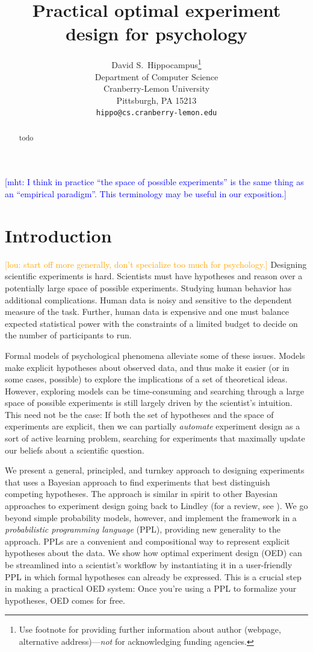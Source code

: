 \documentclass{article}
\title{Practical optimal experiment design for psychology}
\author{
  David S.~Hippocampus\thanks{Use footnote for providing further
    information about author (webpage, alternative
    address)---\emph{not} for acknowledging funding agencies.} \\
  Department of Computer Science\\
  Cranberry-Lemon University\\
  Pittsburgh, PA 15213 \\
  \texttt{hippo@cs.cranberry-lemon.edu} \\
}
\newcommand{\mht}[1]{\textcolor{Blue}{[mht: #1]}}
\newcommand{\lou}[1]{\textcolor{orange}{[lou: #1]}}
\begin{document}

\maketitle

\begin{abstract}
todo
\end{abstract}

\mht{I think in practice ``the space of possible experiments'' is the same thing as an ``empirical paradigm''. This terminology may be useful in our exposition.}

\section{Introduction}
\lou{start off more generally, don't specialize too much for psychology.}
Designing scientific experiments is hard.
Scientists must have hypotheses and reason over a potentially large space of possible experiments.
Studying human behavior has additional complications.
Human data is noisy and sensitive to the dependent measure of the task.
Further, human data is expensive and one must balance expected statistical power with the constraints of a limited budget to decide on the number of participants to run.

Formal models of psychological phenomena alleviate some of these issues.
Models make explicit hypotheses about observed data, and thus make it easier (or in some cases, possible) to explore the implications of a set of theoretical ideas.
However, exploring models can be time-consuming and searching through a large space of possible experiments is still largely driven by the scientist's intuition.
This need not be the case: If both the set of hypotheses and the space of experiments are explicit, then we can partially \emph{automate} experiment design as a sort of active learning problem, searching for experiments that maximally update our beliefs about a scientific question.

We present a general, principled, and turnkey approach to designing experiments that uses a Bayesian approach to find experiments that best distinguish competing hypotheses.
The approach is similar in spirit to other Bayesian approaches to experiment design going back to Lindley \cite{Lindley1956} (for a review, see \cite{Chaloner1995}).
We go beyond simple probability models, however, and implement the framework  in a \emph{probabilistic programming language} (PPL), providing new generality to the approach.
PPLs are a convenient and compositional way to represent explicit hypotheses about the data.
We show how optimal experiment design (OED) can be streamlined into a scientist's workflow by instantiating it in a user-friendly PPL in which formal hypotheses can already be expressed.
This is a crucial step in making a practical OED system: Once you're using a PPL to formalize your hypotheses, OED comes for free.
\end{document}
